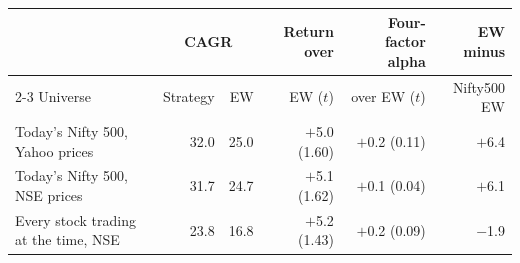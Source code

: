 \begin{tabular}{@{}lrrrrr@{}}
\toprule
 & \multicolumn{2}{c}{CAGR} & Return over & Four-factor alpha & EW minus \\
\cmidrule(lr){2-3}
Universe & Strategy & EW & EW ($t$) & over EW ($t$) & Nifty500 EW \\
\midrule
Today's Nifty 500, Yahoo prices & 32.0 & 25.0 & $+$5.0 (1.60) & $+$0.2 (0.11) & $+$6.4 \\
Today's Nifty 500, NSE prices & 31.7 & 24.7 & $+$5.1 (1.62) & $+$0.1 (0.04) & $+$6.1 \\
Every stock trading at the time, NSE & 23.8 & 16.8 & $+$5.2 (1.43) & $+$0.2 (0.09) & $-$1.9 \\
\bottomrule
\end{tabular}
